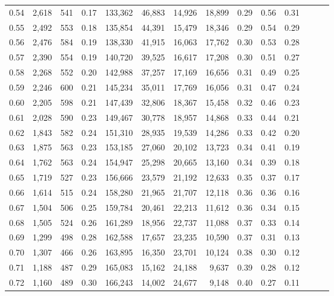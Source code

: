 \begin{tabular}{rrrrrrrrrrrrrr}
0.54 &  2,618 &  541 &  0.17 &  133,362 &   46,883 &  14,926 &  18,899 &  0.29 &  0.56 &      0.31 \\
0.55 &  2,492 &  553 &  0.18 &  135,854 &   44,391 &  15,479 &  18,346 &  0.29 &  0.54 &      0.29 \\
0.56 &  2,476 &  584 &  0.19 &  138,330 &   41,915 &  16,063 &  17,762 &  0.30 &  0.53 &      0.28 \\
0.57 &  2,390 &  554 &  0.19 &  140,720 &   39,525 &  16,617 &  17,208 &  0.30 &  0.51 &      0.27 \\
0.58 &  2,268 &  552 &  0.20 &  142,988 &   37,257 &  17,169 &  16,656 &  0.31 &  0.49 &      0.25 \\
0.59 &  2,246 &  600 &  0.21 &  145,234 &   35,011 &  17,769 &  16,056 &  0.31 &  0.47 &      0.24 \\
0.60 &  2,205 &  598 &  0.21 &  147,439 &   32,806 &  18,367 &  15,458 &  0.32 &  0.46 &      0.23 \\
0.61 &  2,028 &  590 &  0.23 &  149,467 &   30,778 &  18,957 &  14,868 &  0.33 &  0.44 &      0.21 \\
0.62 &  1,843 &  582 &  0.24 &  151,310 &   28,935 &  19,539 &  14,286 &  0.33 &  0.42 &      0.20 \\
0.63 &  1,875 &  563 &  0.23 &  153,185 &   27,060 &  20,102 &  13,723 &  0.34 &  0.41 &      0.19 \\
0.64 &  1,762 &  563 &  0.24 &  154,947 &   25,298 &  20,665 &  13,160 &  0.34 &  0.39 &      0.18 \\
0.65 &  1,719 &  527 &  0.23 &  156,666 &   23,579 &  21,192 &  12,633 &  0.35 &  0.37 &      0.17 \\
0.66 &  1,614 &  515 &  0.24 &  158,280 &   21,965 &  21,707 &  12,118 &  0.36 &  0.36 &      0.16 \\
0.67 &  1,504 &  506 &  0.25 &  159,784 &   20,461 &  22,213 &  11,612 &  0.36 &  0.34 &      0.15 \\
0.68 &  1,505 &  524 &  0.26 &  161,289 &   18,956 &  22,737 &  11,088 &  0.37 &  0.33 &      0.14 \\
0.69 &  1,299 &  498 &  0.28 &  162,588 &   17,657 &  23,235 &  10,590 &  0.37 &  0.31 &      0.13 \\
0.70 &  1,307 &  466 &  0.26 &  163,895 &   16,350 &  23,701 &  10,124 &  0.38 &  0.30 &      0.12 \\
0.71 &  1,188 &  487 &  0.29 &  165,083 &   15,162 &  24,188 &   9,637 &  0.39 &  0.28 &      0.12 \\
0.72 &  1,160 &  489 &  0.30 &  166,243 &   14,002 &  24,677 &   9,148 &  0.40 &  0.27 &      0.11 \\

\end{tabular}
